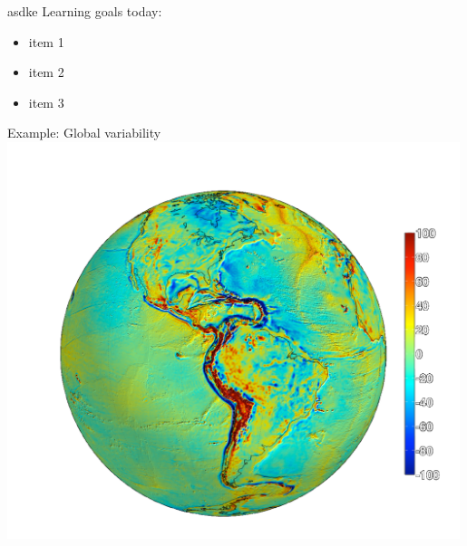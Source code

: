 \begin{frame}
    \begin{PointThree}{asdke}
      \alert{Learning goals today:}
      \begin{itemize}
        \item item 1 
        \item item 2
        \item item 3
      \end{itemize}
    \end{PointThree}
    \end{frame}
    
\begin{frame}
    \begin{PointSix}{Example: Global variability}
        \includegraphics[width=0.99\textwidth]{Figures/Gravity/Exported/Grace_JPLCaltect_FODT10_WithoutPeople.png}
    \end{PointSix}
\end{frame}
    
